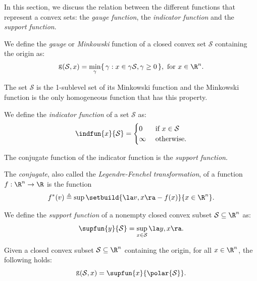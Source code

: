 \documentclass[11pt,twoside,a4paper,openright]{uclouvain-thesis}
\DeclareMathOperator{\gauge}{g}
\begin{document}
In this section, we discuss the relation between the different functions that
represent a convex sets: the \emph{gauge function}, the \emph{indicator function}
and the \emph{support function}.

\begin{mydef}
  We define the \emph{gauge} or \emph{Minkowski} function of a closed convex set $\mathcal{S}$ containing the origin as:
  \[ \gauge(\mathcal{S}, x) = \min_\gamma \{\,\gamma : x \in \gamma \mathcal{S}, \gamma \ge 0\,\}, \text{ for } x \in \R^n. \]
\end{mydef}
The set $\mathcal{S}$ is the 1-sublevel set of its Minkowski function and the Minkowski function
is the only homogeneous function that has this property.

\begin{mydef}
  We define the \emph{indicator function} of a set $\mathcal{S}$ as:
  \[
    \indfun{x}{\mathcal{S}} =
    \begin{cases}
      0 & \text{ if } x \in \mathcal{S}\\
      \infty & \text{ otherwise}.
    \end{cases}
  \]
\end{mydef}

The conjugate function of the indicator function is the \emph{support function}.

\begin{mydef}
  The \emph{conjugate}, also called the \emph{Legendre-Fenchel transformation}, of a function $f : \R^n \to \R$ is the function
  \[
    f^*(v) \triangleq \sup \setbuild{\la v, x \ra - f(x)}{x \in \R^n}.
  \]
\end{mydef}

\begin{mydef}
  We define the \emph{support function} of a nonempty closed convex subset $\mathcal{S} \subseteq \R^n$ as:
  \[ \supfun{y}{\mathcal{S}} = \sup_{x \in \mathcal{S}} \la y, x \ra. \]
\end{mydef}

\begin{myprop}
  \label{prop:gaugesupp}
  Given a closed convex subset $\mathcal{S} \subseteq \R^n$ containing the origin,
  for all $x \in \R^n$, the following holds:
  \[ \gauge(\mathcal{S}, x) = \supfun{x}{\polar{\mathcal{S}}}. \]
\end{myprop}
\end{document}
